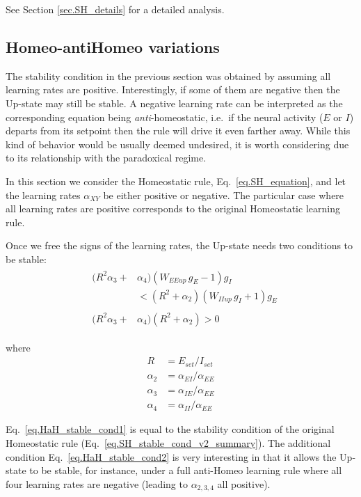 \documentclass[twocolumn]{article}
\newcommand{\EE}{\mathit{EE}}
\newcommand{\EI}{\mathit{EI}}
\newcommand{\IE}{\mathit{IE}}
\newcommand{\II}{\mathit{II}}
\newcommand{\XY}{\mathit{XY}}
\newcommand{\set}{\mathit{set}}
\newcommand{\up}{\mathit{up}}
\begin{document}
See Section \ref{sec.SH_details} for a detailed analysis.



\subsection{Homeo-antiHomeo variations}

The stability condition in the previous section was obtained by assuming all learning rates are positive. Interestingly, if some of them are negative then the Up-state may still be stable. A negative learning rate can be interpreted as the corresponding equation being {\em anti}-homeostatic, i.e.\ if the neural activity ($E$ or $I$) departs from its setpoint then the rule will drive it even farther away. While this kind of behavior would be usually deemed undesired, it is worth considering due to its relationship with the paradoxical regime.

In this section we consider the Homeostatic rule, Eq.\ \ref{eq.SH_equation}, and let the learning rates $\alpha_{\XY}$ be either positive or negative. The particular case where all learning rates are positive corresponds to the original Homeostatic learning rule.

Once we free the signs of the learning rates, the Up-state needs two conditions to be stable:
\begin{eqnarray}
& \begin{aligned}
(R^2 \alpha_3 + & \alpha_4)(W_{\EE\up} \, g_E  - 1)g_I \\
& < (R^2 + \alpha_2)(W_{\II\up} \, g_I + 1)g_E
\end{aligned}
\label{eq.HaH_stable_cond1} \\
& \begin{aligned}
(R^2 \alpha_3 + & \alpha_4)(R^2 + \alpha_2) > 0
\end{aligned}
\label{eq.HaH_stable_cond2}
\end{eqnarray}

\noindent where
\begin{displaymath}
\begin{aligned}
R & = E_{\set}/I_{\set} \\
\alpha_2 & = \alpha_{\EI}/\alpha_{\EE} \\
\alpha_3 & = \alpha_{\IE}/\alpha_{\EE} \\
\alpha_4 & = \alpha_{\II}/\alpha_{\EE}
\end{aligned}
\end{displaymath}

\noindent Eq.\ \ref{eq.HaH_stable_cond1} is equal to the stability condition of the original Homeostatic rule (Eq.\ \ref{eq.SH_stable_cond_v2_summary}). The additional condition Eq.\ \ref{eq.HaH_stable_cond2} is very interesting in that it allows the Up-state to be stable, for instance, under a full anti-Homeo learning rule where all four learning rates are negative (leading to $\alpha_{2,3,4}$ all positive).
\end{document}
